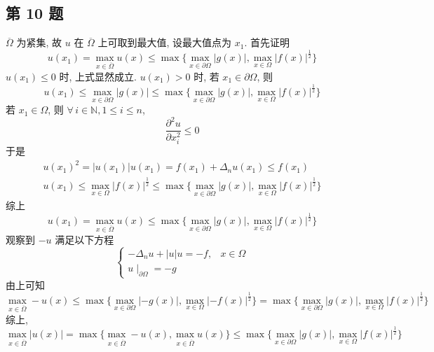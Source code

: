 \documentclass[\ROOT/main.tex]{subfiles}
\begin{document}
\subsection{第 10 题}
$\overline{\Omega}$ 为紧集, 故 $u$ 在 $\overline{\Omega}$ 上可取到最大值, 设最大值点为 $x_1$.
首先证明
\[
    u \left( x_1 \right)
    =
    \max_{x \in \overline{\Omega}} u \left( x \right)
    \leqslant
    \max \{ \max_{x \in \partial \Omega} \left| g \left( x \right) \right|, \max_{x \in \Omega} \left| f \left( x \right) \right|^{\frac{1}{2}} \}
\]
$u \left( x_1 \right) \leqslant 0$ 时, 上式显然成立.
$u \left( x_1 \right) > 0$ 时, 若 $x_1 \in \partial \Omega$, 则
\[
    u \left( x_1 \right)
    \leqslant
    \max_{x \in \partial \Omega} \left| g \left( x \right) \right|
    \leqslant
    \max \{ \max_{x \in \partial \Omega} \left| g \left( x \right) \right|, \max_{x \in \Omega} \left| f \left( x \right) \right|^{\frac{1}{2}} \}
\]
若 $x_1 \in \Omega$, 则 $\forall \, i \in \mathbb{N}, 1 \leqslant i \leqslant n$,
\[
    \frac{\partial^2 u}{\partial x_i^2} \leqslant 0
\]
于是
\begin{gather*}
    u \left( x_1 \right)^2
    =
    \left| u \left( x_1 \right) \right| u \left( x_1 \right)
    =
    f \left( x_1 \right) + \Delta_n u \left( x_1 \right)
    \leqslant
    f \left( x_1 \right) \\
    u \left( x_1 \right)
    \leqslant
    \max_{x \in \Omega} \left| f \left( x \right) \right|^{\frac{1}{2}}
    \leqslant
    \max \{ \max_{x \in \partial \Omega} \left| g \left( x \right) \right|, \max_{x \in \Omega} \left| f \left( x \right) \right|^{\frac{1}{2}} \}
\end{gather*}
综上
\[
    u \left( x_1 \right)
    =
    \max_{x \in \overline{\Omega}} u \left( x \right)
    \leqslant
    \max \{ \max_{x \in \partial \Omega} \left| g \left( x \right) \right|, \max_{x \in \Omega} \left| f \left( x \right) \right|^{\frac{1}{2}} \}
\]
观察到 $- u$ 满足以下方程
\[
    \begin{cases}
        - \Delta_n u + \left| u \right| u = - f, & x \in \Omega \\
        u \mid_{\partial \Omega} = - g
    \end{cases}
\]
由上可知
\[
    \max_{x \in \overline{\Omega}} - u \left( x \right)
    \leqslant
    \max \{ \max_{x \in \partial \Omega} \left| - g \left( x \right) \right|, \max_{x \in \Omega} \left| - f \left( x \right) \right|^{\frac{1}{2}} \}
    =
    \max \{ \max_{x \in \partial \Omega} \left| g \left( x \right) \right|, \max_{x \in \Omega} \left| f \left( x \right) \right|^{\frac{1}{2}} \}
\]
综上,
\[
    \max_{x \in \overline{\Omega}} \left| u \left( x \right) \right|
    =
    \max \{ \max_{x \in \overline{\Omega}} - u \left( x \right), \max_{x \in \overline{\Omega}} u \left( x \right) \}
    \leqslant
    \max \{ \max_{x \in \partial \Omega} \left| g \left( x \right) \right|, \max_{x \in \Omega} \left| f \left( x \right) \right|^{\frac{1}{2}} \}
\]
\end{document}
